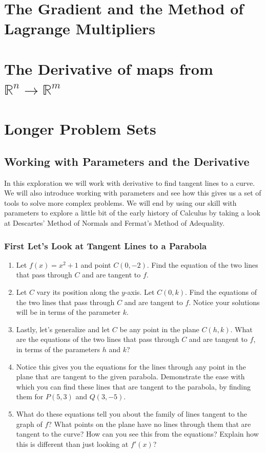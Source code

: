 \documentclass{amsbook}
\begin{document}
\chapter{The Gradient and the Method of Lagrange Multipliers}

\chapter{The Derivative of maps from $\mathbb{R}^n \to \mathbb{R}^m$}

\chapter{Longer Problem Sets}
\newpage
    \section*{Working with Parameters and the Derivative}
    	In this exploration we will work with derivative to find tangent lines to a curve. We will also introduce working with parameters and see how this gives us a set of tools to solve more complex problems. We will end by using our skill with parameters to explore a little bit of the early history of Calculus by taking a look at Descartes' Method of Normals and Fermat's Method of Adequality.
    	\subsection*{First Let's Look at Tangent Lines to a Parabola}
    		\begin{enumerate}
    			\item Let $f(x)=x^2+1$ and point $C(0,-2)$. Find the equation of the two lines that pass through $C$ and are tangent to $f$.\\
    			
				\item Let $C$ vary its position along the $y$-axis. Let $C(0,k)$. Find the equations of the two lines that pass through $C$ and are tangent to $f$. Notice your solutions will be in terms of the 				parameter $k$.\\
				
				\item Lastly, let's generalize and let $C$ be any point in the plane $C(h,k)$. What are the equations of the two lines that pass through $C$ and are tangent to $f$, in terms of the parameters $h$ and $k$? \\
				\item Notice this gives you the equations for the lines through any point in the plane that are tangent to the given parabola. Demonstrate the ease with which you can find these lines that are tangent to the parabola, by finding them for $P(5,3)$ and $Q(3,-5)$.\\
				\item What do these equations tell you about the family of lines tangent to the graph of $f$? What points on the plane have no lines through them that are tangent to the curve? How can you see this from the equations? Explain how this is different than just looking at $f'(x)$?\\
    		\end{enumerate}
    		
\end{document}
